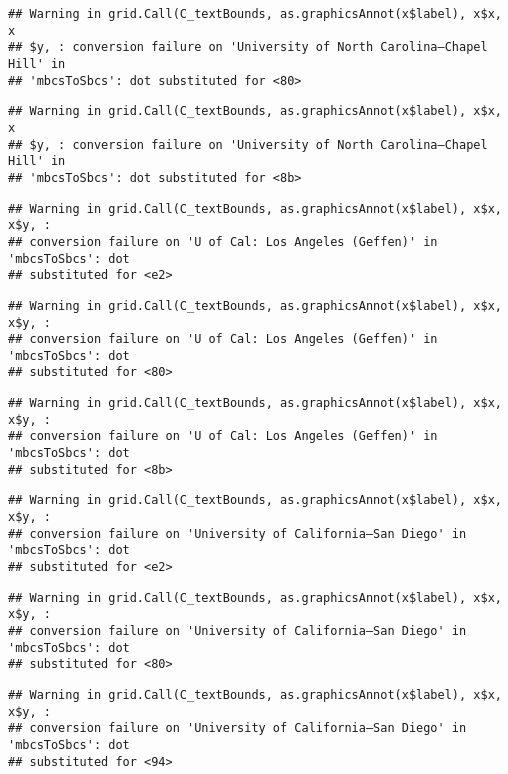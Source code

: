 \documentclass[]{article}
\begin{document}
\begin{verbatim}
## Warning in grid.Call(C_textBounds, as.graphicsAnnot(x$label), x$x, x
## $y, : conversion failure on 'University of North Carolina—​Chapel Hill' in
## 'mbcsToSbcs': dot substituted for <80>
\end{verbatim}

\begin{verbatim}
## Warning in grid.Call(C_textBounds, as.graphicsAnnot(x$label), x$x, x
## $y, : conversion failure on 'University of North Carolina—​Chapel Hill' in
## 'mbcsToSbcs': dot substituted for <8b>
\end{verbatim}

\begin{verbatim}
## Warning in grid.Call(C_textBounds, as.graphicsAnnot(x$label), x$x, x$y, :
## conversion failure on 'U of Cal: ​Los Angeles (Geffen)' in 'mbcsToSbcs': dot
## substituted for <e2>
\end{verbatim}

\begin{verbatim}
## Warning in grid.Call(C_textBounds, as.graphicsAnnot(x$label), x$x, x$y, :
## conversion failure on 'U of Cal: ​Los Angeles (Geffen)' in 'mbcsToSbcs': dot
## substituted for <80>
\end{verbatim}

\begin{verbatim}
## Warning in grid.Call(C_textBounds, as.graphicsAnnot(x$label), x$x, x$y, :
## conversion failure on 'U of Cal: ​Los Angeles (Geffen)' in 'mbcsToSbcs': dot
## substituted for <8b>
\end{verbatim}

\begin{verbatim}
## Warning in grid.Call(C_textBounds, as.graphicsAnnot(x$label), x$x, x$y, :
## conversion failure on 'University of California—​San Diego' in 'mbcsToSbcs': dot
## substituted for <e2>
\end{verbatim}

\begin{verbatim}
## Warning in grid.Call(C_textBounds, as.graphicsAnnot(x$label), x$x, x$y, :
## conversion failure on 'University of California—​San Diego' in 'mbcsToSbcs': dot
## substituted for <80>
\end{verbatim}

\begin{verbatim}
## Warning in grid.Call(C_textBounds, as.graphicsAnnot(x$label), x$x, x$y, :
## conversion failure on 'University of California—​San Diego' in 'mbcsToSbcs': dot
## substituted for <94>
\end{verbatim}
\end{document}
